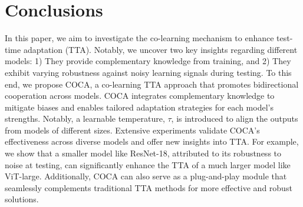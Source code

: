 \vspace{6pt}
\section{Conclusions}
In this paper, we aim to investigate the co-learning mechanism to enhance test-time adaptation (TTA). Notably, we uncover two key insights regarding different models: 1) They provide complementary knowledge from training, and 2) They exhibit varying robustness against noisy learning signals during testing. To this end, we propose COCA, a co-learning TTA approach that promotes bidirectional cooperation across models. COCA integrates complementary knowledge to mitigate biases and enables tailored adaptation strategies for each model’s strengths. Notably, a learnable temperature, $\tau$, is introduced to align the outputs from models of different sizes. Extensive experiments validate COCA's effectiveness across diverse models and offer new insights into TTA. For example, we show that a smaller model like ResNet-18, attributed to its robustness to noise at testing, can significantly enhance the TTA of a much larger model like ViT-large. 
Additionally, COCA can also serve as a plug-and-play module that seamlessly complements traditional TTA methods for more effective and robust solutions. 


% 





